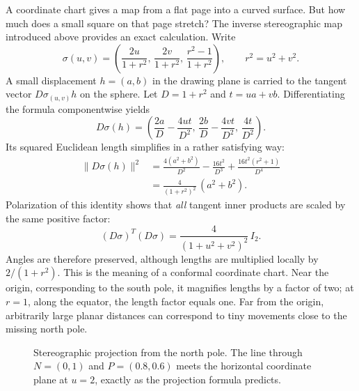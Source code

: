A coordinate chart gives a map from a flat page into a curved surface. But how much does a small square on that page stretch? The inverse stereographic map introduced above provides an exact calculation. Write
\[
 \sigma(u,v)=
 \left(\frac{2u}{1+r^2},\,\frac{2v}{1+r^2},\,
              \frac{r^2-1}{1+r^2}\right),
 \qquad r^2=u^2+v^2.
\]
A small displacement $h=(a,b)$ in the drawing plane is carried to the tangent vector $D\sigma_{(u,v)}h$ on the sphere. Let $D=1+r^2$ and $t=ua+vb$. Differentiating the formula componentwise yields
\[
 D\sigma(h)=
 \left(\frac{2a}{D}-\frac{4ut}{D^2},\,
       \frac{2b}{D}-\frac{4vt}{D^2},\,
       \frac{4t}{D^2}\right).
\]
Its squared Euclidean length simplifies in a rather satisfying way:
\[
 \begin{aligned}
 \|D\sigma(h)\|^2
 &=\frac{4(a^2+b^2)}{D^2}
    -\frac{16t^2}{D^3}
    +\frac{16t^2(r^2+1)}{D^4}\\
 &=\frac{4}{(1+r^2)^2}\,(a^2+b^2).
 \end{aligned}
\]
Polarization of this identity shows that \emph{all} tangent inner products are scaled by the same positive factor:
\[
 \boxed{(D\sigma)^T(D\sigma)
  =\frac{4}{(1+u^2+v^2)^2}\,I_2.}
\]
Angles are therefore preserved, although lengths are multiplied locally by $2/(1+r^2)$. This is the meaning of a conformal coordinate chart. Near the origin, corresponding to the south pole, it magnifies lengths by a factor of two; at $r=1$, along the equator, the length factor equals one. Far from the origin, arbitrarily large planar distances can correspond to tiny movements close to the missing north pole.

\begin{figure}[H]
\centering
{}
\caption{Stereographic projection from the north pole. The line through $N=(0,1)$ and $P=(0.8,0.6)$ meets the horizontal coordinate plane at $u=2$, exactly as the projection formula predicts.}
\end{figure}

